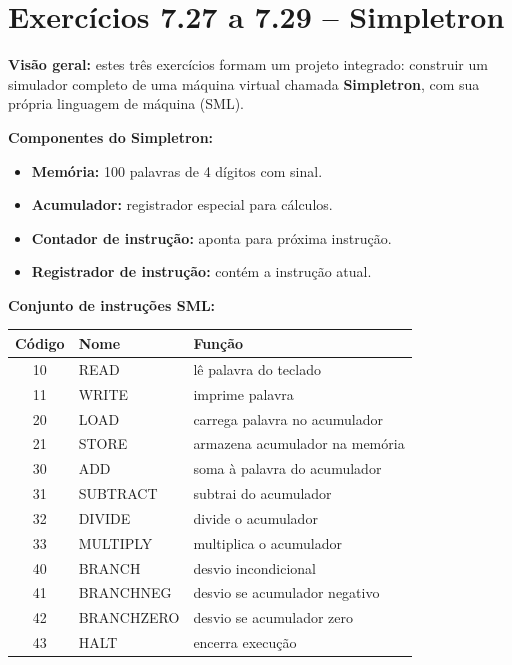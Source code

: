 \documentclass[12pt,a4paper]{article}
\begin{document}
\section{Exercícios 7.27 a 7.29 -- Simpletron}

\begin{respostabox}
\textbf{Visão geral:} estes três exercícios formam um projeto integrado: construir
um simulador completo de uma máquina virtual chamada \textbf{Simpletron}, com sua
própria linguagem de máquina (SML).

\textbf{Componentes do Simpletron:}
\begin{itemize}[noitemsep]
  \item \textbf{Memória:} 100 palavras de 4 dígitos com sinal.
  \item \textbf{Acumulador:} registrador especial para cálculos.
  \item \textbf{Contador de instrução:} aponta para próxima instrução.
  \item \textbf{Registrador de instrução:} contém a instrução atual.
\end{itemize}

\textbf{Conjunto de instruções SML:}
\begin{center}
\renewcommand{\arraystretch}{1.2}
\begin{tabular}{c l l}
\toprule
\textbf{Código} & \textbf{Nome} & \textbf{Função} \\ \midrule
10 & READ      & lê palavra do teclado \\
11 & WRITE     & imprime palavra \\
20 & LOAD      & carrega palavra no acumulador \\
21 & STORE     & armazena acumulador na memória \\
30 & ADD       & soma à palavra do acumulador \\
31 & SUBTRACT  & subtrai do acumulador \\
32 & DIVIDE    & divide o acumulador \\
33 & MULTIPLY  & multiplica o acumulador \\
40 & BRANCH    & desvio incondicional \\
41 & BRANCHNEG & desvio se acumulador negativo \\
42 & BRANCHZERO & desvio se acumulador zero \\
43 & HALT      & encerra execução \\
\bottomrule
\end{tabular}
\end{center}


\end{respostabox}
\end{document}
